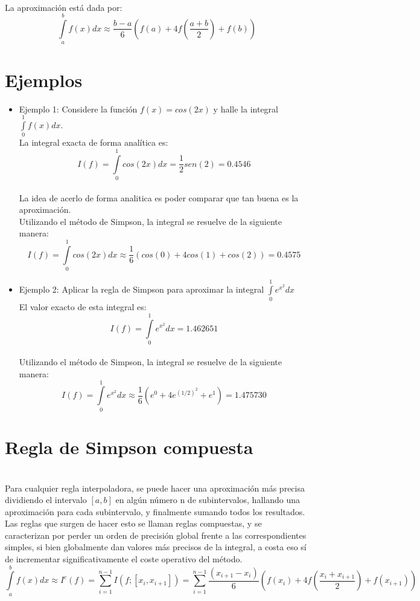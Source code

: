 \documentclass[report,oneside]{revcoles}
\begin{document}
~\\La aproximación está dada por:
$$\int\limits^{b}_{a}f(x)dx \approx \frac{b-a}{6}\left(f(a)+4f\left(\frac{a+b}{2}\right)+f(b)\right)$$

\section{Ejemplos}
\begin{itemize}
\item[]Ejemplo 1: Considere la función $f(x)=cos(2x)$ y halle la integral $\int\limits^{1}_{0} f(x)dx$.
~\\ La integral exacta de forma analítica es:
$$I(f)=\int\limits_{0}^{1}cos(2x)dx=\frac{1}{2}sen(2)=0.4546$$ 
~\\ La idea de acerlo de forma analitica es poder comparar que tan buena es la aproximación.
~\\ Utilizando el método de Simpson, la integral se resuelve de la siguiente manera:
$$I(f)=\int\limits_{0}^{1}cos(2x)dx \approx \frac{1}{6}(cos(0)+4cos(1)+cos(2))=0.4575$$
\item[]Ejemplo 2: Aplicar la regla de Simpson para aproximar la integral $\int\limits_{0}^{1}e^{x^2}dx$
~\\El valor exacto de esta integral es:
$$I(f)=\int\limits_{0}^{1}e^{x^2}dx=1.462651$$ 
~\\ Utilizando el método de Simpson, la integral se resuelve de la siguiente manera:
$$I(f)=\int\limits_{0}^{1}e^{x^2}dx \approx \frac{1}{6}(e^{0}+4 e^{(1/2)^2}+e^{1})=1.475730$$

\end{itemize}


\section{Regla de Simpson compuesta}
~\\Para cualquier regla interpoladora, se puede hacer una aproximación más precisa dividiendo el intervalo $[a,b]$ en algún número n de subintervalos, hallando una aproximación para cada subintervalo, y finalmente sumando todos los resultados. Las reglas que surgen de hacer esto se llaman reglas compuestas, y se caracterizan por perder un orden de precisión global frente a las correspondientes simples, si bien globalmente dan valores más precisos de la integral, a costa eso sí de incrementar significativamente el coste operativo del método.
$$\int\limits_{a}^{b}f(x)dx \approx I^{c}(f)=\sum\limits_{i=1}^{n-1}I(f;[x_{i},x_{i+1}])=\sum\limits_{i=1}^{n-1}\frac{(x_{i+1}-x_{i})}{6}\left(f(x_{i})+4f\left(\frac{x_{i}+x_{i+1}}{2} \right)+f(x_{i+1})\right)$$
\end{document}
